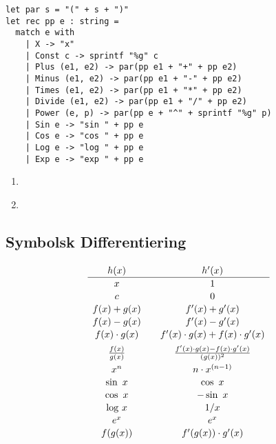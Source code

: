 \documentclass[rgb]{beamer}
\renewcommand{\log}{\ensuremath{\mathrm{log}}}
\begin{document}
\begin{frame}[fragile]
\begin{footnotesize}


  \vspace{2ex}

\begin{lstlisting}[numbers=none,frame=none,mathescape]
let par s = "(" + s + ")"
let rec pp e : string =
  match e with
    | X -> "x"
    | Const c -> sprintf "%g" c
    | Plus (e1, e2) -> par(pp e1 + "+" + pp e2)
    | Minus (e1, e2) -> par(pp e1 + "-" + pp e2)
    | Times (e1, e2) -> par(pp e1 + "*" + pp e2)
    | Divide (e1, e2) -> par(pp e1 + "/" + pp e2)
    | Power (e, p) -> par(pp e + "^" + sprintf "%g" p)
    | Sin e -> "sin " + pp e
    | Cos e -> "cos " + pp e
    | Log e -> "log " + pp e
    | Exp e -> "exp " + pp e
\end{lstlisting}

\begin{enumerate}
\item \underline{\hspace{8cm}}
\item \underline{\hspace{8cm}}
\end{enumerate}

\end{footnotesize}
\end{frame}

\subsection{Symbolsk Differentiering}
\begin{frame}[fragile]
\begin{footnotesize}
\end{footnotesize}

\[\def\arraystretch{1.1}
\begin{array}{c@{\quad\quad}c}
h(x) & h'(x) \\\hline
x & 1 \\
c & 0 \\
f(x) + g(x) & f'(x) + g'(x) \\
f(x) - g(x) & f'(x) - g'(x) \\
f(x) \cdot g(x) & f'(x)\cdot g(x) + f(x)\cdot g'(x) \\[1ex]
\frac{f(x)}{g(x)} & \frac{f'(x)\cdot g(x) - f(x)\cdot g'(x)}{(g(x))^2}
\\[1ex]
x^n & n\cdot x^{(n-1)} \\
\sin~x & \cos~x \\
\cos~x & - \sin~x \\
\log~x &  1 / x \\
e^x & e^x \\
f(g(x)) & f'(g(x))\cdot g'(x)\\
\end{array}\]

\end{frame}
\end{document}
